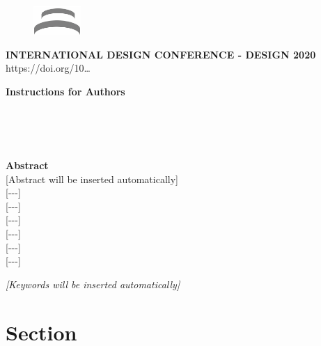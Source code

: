 \documentclass{design}
\begin{document}
{
    \titlefont
    \small
    \begin{figure}
        \raggedleft
        \vspace{-0.2cm}
        \includegraphics[width=1.8cm]{design-logo.png}
    \end{figure}
    \noindent \textbf{INTERNATIONAL DESIGN CONFERENCE - DESIGN 2020}\\
    https://doi.org/10\ldots{}
    
    \vspace{2cm}
    
    \Large \noindent \textbf{Instructions for Authors}
    
    \vspace{1cm}
    
    \normalsize {}\\[0.2cm]
    \footnotesize {}\\[0.1cm]
    \footnotesize {}\\
    
    \begin{mdframed}[backgroundcolor=gray!20] 
        \normalsize \noindent \textbf{Abstract} \\
        \normalfont \small [Abstract will be inserted automatically] \\
        \normalfont \small [-\phantom{}-\phantom{}-] \\
        \normalfont \small [-\phantom{}-\phantom{}-] \\
        \normalfont \small [-\phantom{}-\phantom{}-] \\
        \normalfont \small [-\phantom{}-\phantom{}-] \\
        \normalfont \small [-\phantom{}-\phantom{}-] \\
        \normalfont \small [-\phantom{}-\phantom{}-]
    \end{mdframed}
    
    \small \noindent \textit{[Keywords will be inserted automatically]}
    
    \vspace{0.5cm}
}


\section{Section}
\end{document}
